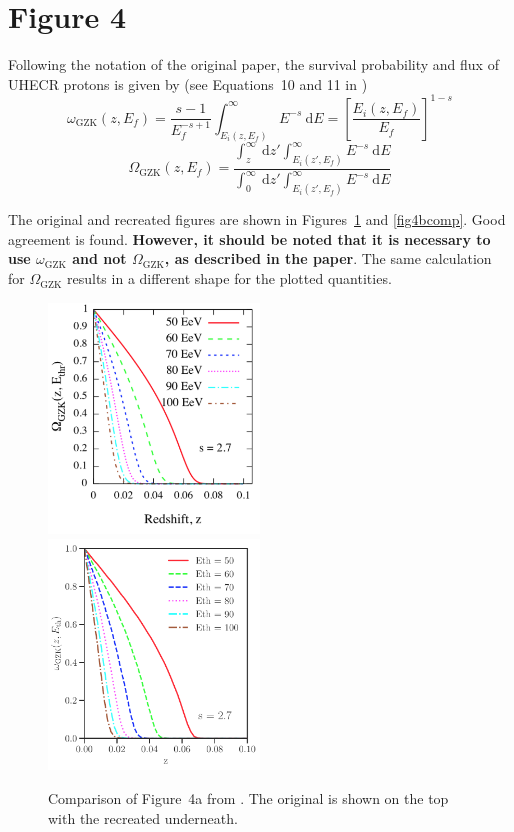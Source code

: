\documentclass[fontsize=12pt]{article}
\begin{document}
\section*{Figure 4}

Following the notation of the original paper, the survival probability and flux of UHECR protons is given by (see Equations~10 and 11 in \cite{MD2012})
\begin{equation}
\omega_\mathrm{GZK}(z, E_f) = \frac{s-1}{E_f^{-s+1}} \int_{E_i(z, E_f)}^{\infty} E^{-s} \ \mathrm{d} E = \left[ \frac{E_i(z, E_f)}{E_f} \right]^{1 - s}
\label{omega}
\end{equation}
\begin{equation}
\Omega_{\mathrm{GZK}}(z, E_f) = \frac{\int_z^{\infty} \ \mathrm{d}z' \int_{E_i(z', E_f)}^{\infty} E^{-s} \ \mathrm{d}E }{\int_0^{\infty} \ \mathrm{d}z' \int_{E_i(z', E_f)}^{\infty} E^{-s} \ \mathrm{d}E }
\label{Omega}
\end{equation}

The original and recreated figures are shown in Figures~\ref{fig4acomp} and \ref{fig4bcomp}. Good agreement is found. \textbf{However, it should be noted that it is necessary to use $\omega_\mathrm{GZK}$ and not $\Omega_\mathrm{GZK}$, as described in the paper}. The same calculation for $\Omega_\mathrm{GZK}$ results in a different shape for the plotted quantities. 

\begin{figure}
\centering
\includegraphics[width=0.5\textwidth]{figures/fig4a_original.png}
\includegraphics[width=0.5\textwidth]{figures/Fig4a_MD2012.pdf}
 \caption{Comparison of Figure~4a from \cite{MD2012}. The original is shown on the top with the recreated underneath.}
 \label{fig4acomp}
\end{figure}
\end{document}
